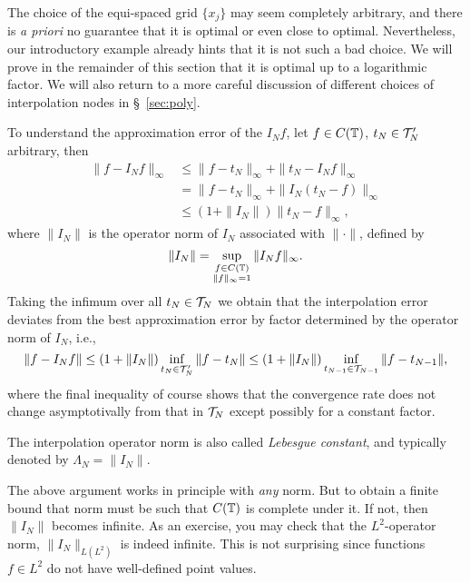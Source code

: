 \medskip

\begin{remark}
  The choice of the equi-spaced grid $\{x_j\}$ may seem completely arbitrary,
  and there is {\it a priori} no guarantee that it is optimal or even close to
  optimal. Nevertheless, our introductory example already hints that it is not
  such a bad choice. We will prove in the remainder of this section that it is
  optimal up to a logarithmic factor. We will also return to a more careful
  discussion of different choices of interpolation nodes in \S~\ref{sec:poly}.
\end{remark}

To understand the approximation error of the $I_N f$, let $f \in C(\mathbb{T})$, $t_N
\in \mathcal{T}_N'$ arbitrary, then
\begin{align*}
  \|f - I_N f \|_\infty &\leq \|f - t_N \|_\infty + \| t_N - I_N f\|_\infty \\
    & = \|f - t_N \|_\infty + \| I_N (t_N - f) \|_\infty \\
    & \leq (1 + \|I_N\|) \| t_N - f \|_\infty,
\end{align*}
where $\|I_N\|$ is the operator norm of $I_N$ associated with $\|\cdot\|$,
defined by
\[
    \| I_N \| = \sup_{\substack{f \in C(\mathbb{T}) \\ \|f\|_\infty = 1}} \| I_N f \|_\infty.
\]
Taking the infimum over all $t_N \in \mathcal{T}_N$ we obtain that the
interpolation error deviates from the best approximation error by
factor determined by the operator norm of $I_N$, i.e.,
\[
    \|f - I_N f \| \leq (1 + \|I_N\|) \inf_{t_N \in \mathcal{T}_N'} \|f - t_N \|
    \leq (1 + \|I_N\|) \inf_{t_{N-1} \in \mathcal{T}_{N-1}} \|f - t_{N-1} \|,
\]
where the final inequality of course shows that the convergence rate does not
change asymptotivally from that in $\mathcal{T}_N$ except possibly for a constant
factor.

\begin{definition}
  The interpolation operator norm is also called {\em Lebesgue constant}, and
  typically denoted by $\Lambda_N = \| I_N \|$.
\end{definition}

\begin{remark}
  The above argument works in principle with {\em any} norm. But to obtain a
  finite bound that norm must be such that $C(\mathbb{T})$ is complete under it. If
  not, then $\|I_N\|$ becomes infinite. As an exercise, you may check that the
  $L^2$-operator norm, $\|I_N\|_{L(L^2)}$ is indeed infinite. This is not
  surprising since functions $f \in L^2$ do not have well-defined point values.
\end{remark}

